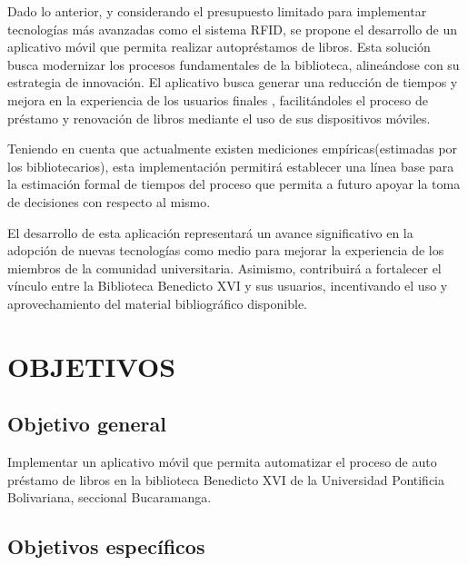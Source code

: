\documentclass[spanish]{ieee_upb}
\begin{document}
Dado lo anterior, y considerando el presupuesto limitado para implementar tecnologías más avanzadas como el sistema RFID, se propone el desarrollo de un aplicativo móvil que permita realizar autopréstamos de libros. Esta solución busca modernizar los procesos fundamentales de la biblioteca, alineándose con su estrategia de innovación. El aplicativo busca generar una reducción de tiempos y mejora  en la experiencia de los usuarios finales , facilitándoles el proceso de préstamo y renovación de libros mediante el uso de sus dispositivos móviles.  
\vspace{0.3 cm}

Teniendo en cuenta que actualmente existen mediciones empíricas(estimadas por los bibliotecarios), esta implementación permitirá establecer una línea base para la estimación formal de tiempos del proceso que permita a futuro apoyar la toma de decisiones con respecto  al mismo.
\vspace{0.3 cm}

El desarrollo de esta aplicación representará un avance significativo en la adopción de nuevas tecnologías como medio para mejorar la experiencia de los miembros de la comunidad universitaria. Asimismo, contribuirá a fortalecer el vínculo entre la Biblioteca Benedicto XVI y sus usuarios, incentivando el uso y aprovechamiento del material bibliográfico disponible.
\vspace{0.3 cm}


\newpage
\section{OBJETIVOS}

\subsection{Objetivo general}

Implementar un aplicativo móvil que permita automatizar el proceso de auto préstamo de libros en la biblioteca Benedicto XVI de la Universidad Pontificia Bolivariana, seccional Bucaramanga.
\subsection{Objetivos específicos}
\end{document}
